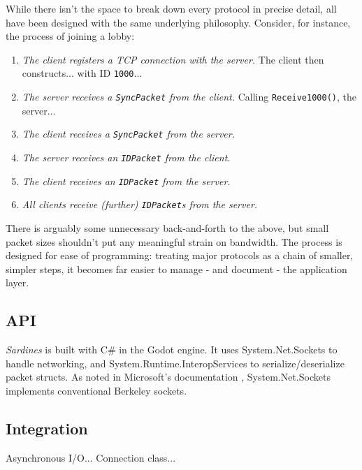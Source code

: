 \documentclass[a4paper, 9pt]{article}
\begin{document}
\begin{flushleft}
\vspace{5pt}\noindent
While there isn't the space to break down every protocol in precise detail, all have been designed with the same underlying philosophy. Consider, for instance, the process of joining a lobby:
\begin{enumerate}[label=\textit{\arabic*}\textit{.}, noitemsep]
\item \textit{The client registers a TCP connection with the server.} The client then constructs... with ID \texttt{1000}...
\item \textit{The server receives a \texttt{SyncPacket} from the client.} Calling \texttt{Receive1000()}, the server...
\item \textit{The client receives a \texttt{SyncPacket} from the server.}
\item \textit{The server receives an \texttt{IDPacket} from the client.}
\item \textit{The client receives an \texttt{IDPacket} from the server.}
\item \textit{All clients receive (further) \texttt{IDPacket}s from the server.}
\end{enumerate}
There is arguably some unnecessary back-and-forth to the above, but small packet sizes shouldn't put any meaningful strain on bandwidth. The process is designed for ease of programming: treating major protocols as a chain of smaller, simpler steps, it becomes far easier to manage - and document - the application layer. 


\subsection*{API}

\textit{Sardines} is built with C\# in the Godot engine. It uses System.Net.Sockets to handle networking, and System.Runtime.InteropServices to serialize/deserialize packet structs. As noted in Microsoft's documentation \citeyearpar{msftSNS}, System.Net.Sockets implements conventional Berkeley sockets.



\pagebreak
\subsection*{Integration}

Asynchronous I/O...
Connection class...


\end{flushleft}
\end{document}
